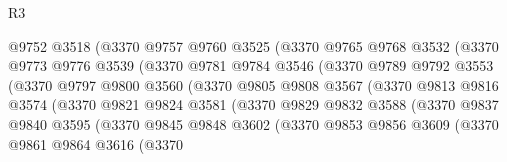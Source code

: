 \begin{lexlean}{R3}
\begin{coremodule}
                        @9752
                        @3518
                        (@3370
                          @9757
                          @9760
                          @3525
                          (@3370
                            @9765
                            @9768
                            @3532
                            (@3370
                              @9773
                              @9776
                              @3539
                              (@3370
                                @9781
                                @9784
                                @3546
                                (@3370
                                  @9789
                                  @9792
                                  @3553
                                  (@3370
                                    @9797
                                    @9800
                                    @3560
                                    (@3370
                                      @9805
                                      @9808
                                      @3567
                                      (@3370
                                        @9813
                                        @9816
                                        @3574
                                        (@3370
                                          @9821
                                          @9824
                                          @3581
                                          (@3370
                                            @9829
                                            @9832
                                            @3588
                                            (@3370
                                              @9837
                                              @9840
                                              @3595
                                              (@3370
                                                @9845
                                                @9848
                                                @3602
                                                (@3370
                                                  @9853
                                                  @9856
                                                  @3609
                                                  (@3370
                                                    @9861
                                                    @9864
                                                    @3616
                                                    (@3370

\end{coremodule}
\end{lexlean}
